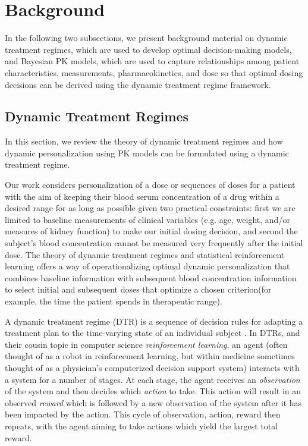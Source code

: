 \section{Background}\label{ss:background}

In the following two subsections, we present background material on dynamic treatment regimes, which are used to develop optimal decision-making models, and Bayesian PK models, which are used to capture relationships among patient characteristics, measurements, pharmacokinetics, and dose so that optimal dosing decisions can be derived using the dynamic treatment regime framework.

\subsection{Dynamic Treatment Regimes}

In this section, we review the theory of dynamic treatment regimes and how dynamic personalization using PK models can be formulated using a dynamic treatment regime.

Our work considers personalization of a dose or sequences of doses for a patient with the aim of keeping their blood serum concentration of a drug within a desired range for as long as possible given two practical constraints: first we are limited to baseline measurements of clinical variables (e.g. age, weight, and/or measures of kidney function) to make our initial dosing decision, and second the subject’s blood concentration cannot be measured very frequently after the initial dose. The theory of dynamic treatment regimes and statistical reinforcement learning offers a way of operationalizing optimal dynamic personalization that combines baseline information with subsequent blood concentration information to select initial and subsequent doses that optimize a chosen criterion(for example, the time the patient spends in therapeutic range).

A dynamic treatment regime (DTR) is a sequence of decision rules for adapting a treatment plan to the time-varying state of an individual subject \cite{chakraborty2013statistical}. In DTRs, and their cousin topic in computer science \textit{reinforcement learning}, an agent (often thought of as a robot in reinforcement learning, but within medicine sometimes thought of as a physician’s computerized decision support system) interacts with a system for a number of stages. At each stage, the agent receives an \textit{observation} of the system and then decides which \textit{action} to take.  This action will result in an observed \textit{reward} which is followed by a new observation of the system after it has been impacted by the action.  This cycle of observation, action, reward then repeats, with the agent aiming to take actions which yield the largest total reward.

